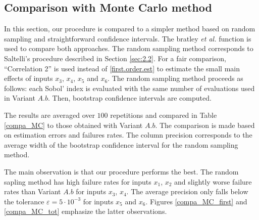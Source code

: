 {\subsection{Comparison with Monte Carlo method}

In this section, our procedure is compared to a simpler method based on random sampling and straightforward confidence intervals. The bratley \textit{et al.} function is used to compare both approaches. The random sampling method corresponds to Saltelli's procedure described in Section \ref{sec:2.2}. For a fair comparison, ``Correlation 2'' is used instead of \eqref{first.order.est} to estimate the small main effects of inputs $x_3$, $x_4$, $x_5$ and $x_6$. The random sampling method proceeds as follows: each Sobol' index is evaluated with the same number of evaluations used in Variant $A.b$. Then, bootstrap confidence intervals are computed. 

The results are averaged over $100$ repetitions and compared in Table \ref{compa_MC} to those obtained with Variant $A.b$. The comparison is made based on estimation errors and failures rates. The column precision corresponds to the average width of the bootstrap confidence interval for the random sampling method.

The main observation is that our procedure performs the best. The random sapling method has high failure rates for inputs $x_1$, $x_2$ and slightly worse failure rates than Variant $A.b$ for inputs $x_3$, $x_4$. The average precision only falls below the tolerance $\varepsilon=5\cdot10^{-3}$ for inputs $x_5$ and $x_6$. Figures \ref{compa_MC_first} and \ref{compa_MC_tot} emphasize the latter observations.


}
